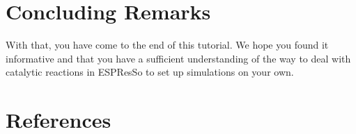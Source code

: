 \documentclass[aip,jcp,reprint,a4paper,onecolumn,nofootinbib,amsmath,amssymb]{revtex4-1}
\newcommand{\es}{\mbox{\textsf{ESPResSo}}\xspace}
\begin{document}
\section{Concluding Remarks}

With that, you have come to the end of this tutorial. We hope you
found it informative and that you have a sufficient understanding of
the way to deal with catalytic reactions in \es{} to set up
simulations on your own.

\section*{References}



\end{document}

